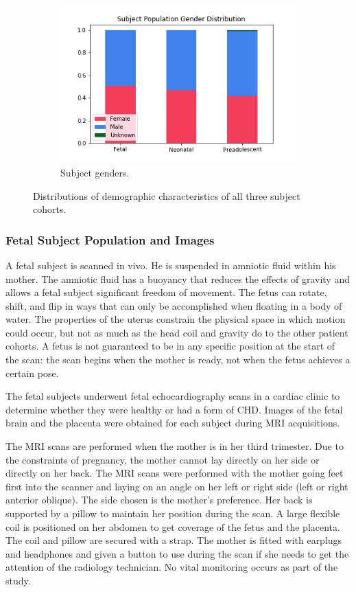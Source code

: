 \begin{figure}
\begin{subfigure}{0.45\textwidth}
    \includegraphics[width=1.0\textwidth]{5/demo_clinical_subj_gender.png}
    \caption{Subject genders.}
    \label{ch5:clinical:gender}
  \end{subfigure}
  \caption{Distributions of demographic characteristics of all three subject cohorts.}
\end{figure}

\subsubsection{Fetal Subject Population and Images}

A fetal subject is scanned in vivo. He is suspended in amniotic fluid within his mother. The amniotic fluid has a buoyancy that reduces the effects of gravity and allows a fetal subject significant freedom of movement. The fetus can rotate, shift, and flip in ways that can only be accomplished when floating in a body of water. The properties of the uterus constrain the physical space in which motion could occur, but not as much as the head coil and gravity do to the other patient cohorts. A fetus is not guaranteed to be in any specific position at the start of the scan: the scan begins when the mother is ready, not when the fetus achieves a certain pose. 

The fetal subjects underwent fetal echocardiography scans in a cardiac clinic to determine whether they were healthy or had a form of CHD. Images of the fetal brain and the placenta were obtained for each subject during MRI acquisitions.

The MRI scans are performed when the mother is in her third trimester. Due to the constraints of pregnancy, the mother cannot lay directly on her side or directly on her back. The MRI scans were performed with the mother going feet first into the scanner and laying on an angle on her left or right side (left or right anterior oblique). The side chosen is the mother's preference. Her back is supported by a pillow to maintain her position during the scan. A large flexible coil is positioned on her abdomen to get coverage of the fetus and the placenta. The coil and pillow are secured with a strap. The mother is fitted with earplugs and headphones and given a button to use during the scan if she needs to get the attention of the radiology technician. No vital monitoring occurs as part of the study.

